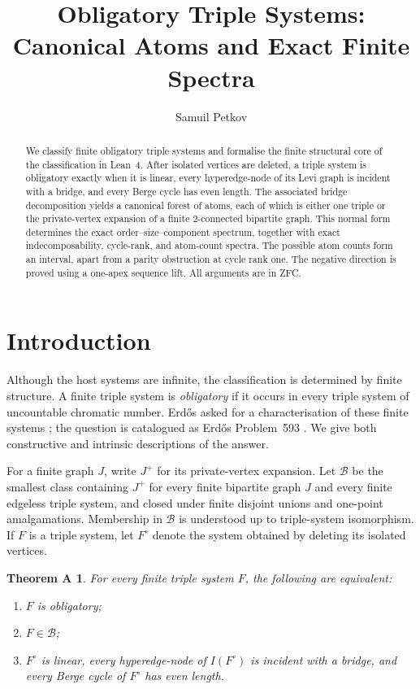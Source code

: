 \documentclass[a4paper,11pt,reqno]{amsart}
\title[Obligatory triple systems]{Obligatory Triple Systems: Canonical Atoms and Exact Finite Spectra}
\author{Samuil Petkov}
\theoremstyle{plain}
\newtheorem*{theoremA}{Theorem A}
\theoremstyle{definition}
\theoremstyle{remark}
\begin{document}
\begin{abstract}
We classify finite obligatory triple systems and formalise the finite
structural core of the classification in Lean~4.  After isolated vertices
are deleted, a triple system is obligatory exactly when it is linear, every
hyperedge-node of its Levi graph is incident with a bridge, and every Berge
cycle has even length.  The associated bridge decomposition yields a
canonical forest of atoms, each of which is either one triple or the
private-vertex expansion of a finite $2$-connected bipartite graph.  This
normal form determines the exact order--size--component spectrum, together
with exact indecomposability, cycle-rank, and atom-count spectra.  The
possible atom counts form an interval, apart from a parity obstruction at
cycle rank one.  The negative direction is proved using a one-apex sequence
lift.  All arguments are in ZFC.
\end{abstract}

\maketitle

\section*{Introduction}\label{introduction}

Although the host systems are infinite, the classification is determined by
finite structure.  A finite triple system is \emph{obligatory} if it occurs
in every triple system of uncountable chromatic number.  Erdős asked for a
characterisation of these finite systems \citep{erdos1995}; the question is
catalogued as Erdős Problem~593 \citep{bloom593}.  We give both constructive
and intrinsic descriptions of the answer.

For a finite graph $J$, write $J^+$ for its private-vertex expansion.  Let
$\mathcal B$ be the smallest class containing $J^+$ for every finite
bipartite graph $J$ and every finite edgeless triple system, and closed under
finite disjoint unions and one-point amalgamations.  Membership in
$\mathcal B$ is understood up to triple-system isomorphism.  If $F$ is a
triple system, let $F^\circ$ denote the system obtained by deleting its
isolated vertices.

\begin{theoremA}\label{theorem-a-exact-characterisation}
For every finite triple system $F$, the following are equivalent:
\begin{enumerate}
\item $F$ is obligatory;
\item $F\in\mathcal B$;
\item $F^\circ$ is linear, every hyperedge-node of $I(F^\circ)$ is incident
with a bridge, and every Berge cycle of $F^\circ$ has even length.
\end{enumerate}
\end{theoremA}
\end{document}
